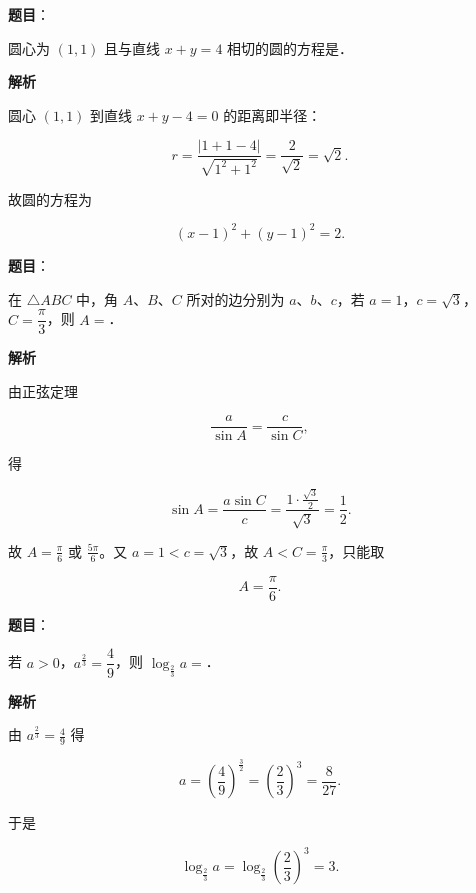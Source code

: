 \begin{answer}

\textbf{题目}：

圆心为 $(1,1)$ 且与直线 $x+y=4$ 相切的圆的方程是\gkblank{}．

\textbf{解析}

圆心 $(1,1)$ 到直线 $x+y-4=0$ 的距离即半径：

\nopagebreak[4]
\[r=\frac{|1+1-4|}{\sqrt{1^2+1^2}}=\frac{2}{\sqrt2}=\sqrt2 .\]

故圆的方程为

\nopagebreak[4]
\[(x-1)^2+(y-1)^2=2 .\]


\end{answer}
\begin{answer}

\textbf{题目}：

在 $\triangle ABC$ 中，角 $A$、$B$、$C$ 所对的边分别为 $a$、$b$、$c$，若 $a=1$，$c=\sqrt3$，$C=\dfrac{\pi}{3}$，则 $A=$\gkblank{}．

\textbf{解析}

由正弦定理

\nopagebreak[4]
\[\frac{a}{\sin A}=\frac{c}{\sin C},\]

得

\nopagebreak[4]
\[\sin A=\frac{a\sin C}{c}=\frac{1\cdot\frac{\sqrt3}{2}}{\sqrt3}=\frac12 .\]

故 $A=\frac{\pi}{6}$ 或 $\frac{5\pi}{6}$。又 $a=1<c=\sqrt3$，故 $A<C=\frac{\pi}{3}$，只能取

\nopagebreak[4]
\[A=\frac{\pi}{6}.\]


\end{answer}
\begin{answer}

\textbf{题目}：

若 $a>0$，$a^{\frac23}=\dfrac49$，则 $\log_{\frac23}a=$\gkblank{}．

\textbf{解析}

由 $a^{\frac23}=\frac49$ 得

\nopagebreak[4]
\[a=\left(\frac49\right)^{\frac32}=\left(\frac23\right)^3=\frac{8}{27}.\]

于是

\nopagebreak[4]
\[\log_{\frac23}a=\log_{\frac23}\left(\frac23\right)^3=3 .\]


\end{answer}
